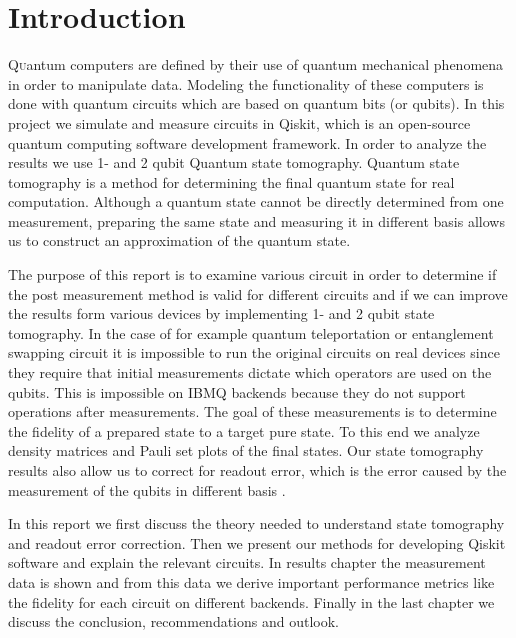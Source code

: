 \section{Introduction}

\lettrine[nindent=0em,lines=3]{Q}uantum computers are defined by their use of quantum mechanical phenomena in order to manipulate data. Modeling the functionality of these computers is done with quantum circuits which are based on quantum bits (or qubits). In this project we simulate and measure circuits in Qiskit, which is an open-source quantum computing software development framework. In order to analyze the results we use 1- and 2 qubit Quantum state tomography. Quantum state tomography is a method for determining the final quantum state for real computation. Although a quantum state cannot be directly determined from one measurement, preparing the same state and measuring it in different basis allows us to construct an approximation of the quantum state.

The purpose of this report is to examine various circuit in order to determine if the post measurement method is valid for different circuits and if we can improve the results form various devices by implementing 1- and 2 qubit state tomography. In the case of for example quantum teleportation or entanglement swapping circuit it is impossible to run the original circuits on real devices since they require that initial measurements dictate which operators are used on the qubits. This is impossible on IBMQ backends because they do not support operations after measurements. The goal of these measurements is to determine the fidelity of a prepared state to a target pure state. To this end we analyze density matrices and Pauli set plots of the final states. Our state tomography results also allow us to correct for readout error, which is the error caused by the measurement of the qubits in different basis \cite{nielsen10_quant}.

In this report we first discuss the theory needed to understand state tomography and readout error correction. Then we present our methods for developing Qiskit software and explain the relevant circuits. In results chapter the measurement data is shown and from this data we derive important performance metrics like the fidelity for each circuit on different backends. Finally in the last chapter we discuss the conclusion, recommendations and outlook.
